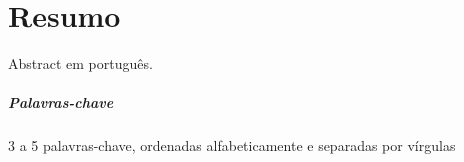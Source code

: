 \chapter*{Resumo}
\thispagestyle{title_on_header}
Abstract em português.

\paragraph{Palavras-chave} 3 a 5 palavras-chave, ordenadas alfabeticamente e separadas por vírgulas